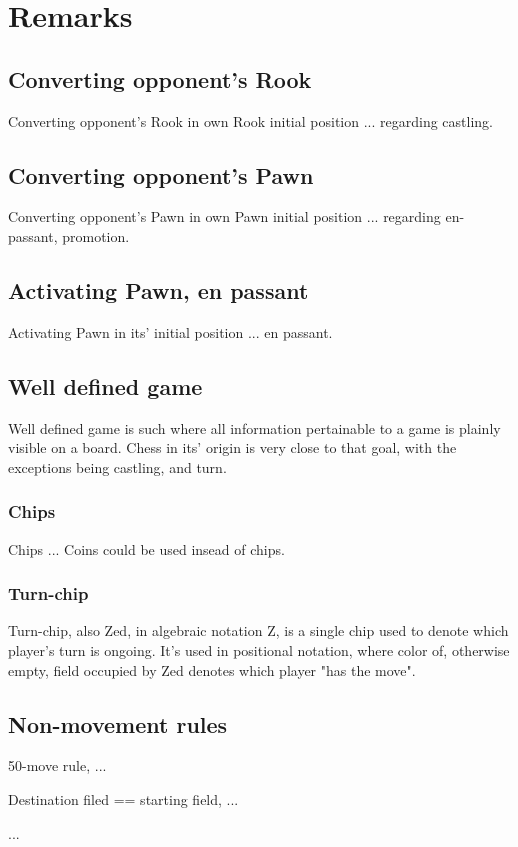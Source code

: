 
\chapter*{Remarks}

\section*{Converting opponent's Rook}

Converting opponent's Rook in own Rook initial position ... regarding castling.

\section*{Converting opponent's Pawn}

Converting opponent's Pawn in own Pawn initial position ... regarding en-passant, promotion.

\section*{Activating Pawn, en passant}

Activating Pawn in its' initial position ... en passant.

\section*{Well defined game}

Well defined game is such where all information pertainable to a game
is plainly visible on a board. Chess in its' origin is very close to
that goal, with the exceptions being castling, and turn.

\subsection*{Chips}
Chips ...
Coins could be used insead of chips.

\subsection*{Turn-chip}
Turn-chip, also Zed, in algebraic notation Z, is a single chip used to
denote which player's turn is ongoing. It's used in positional notation,
where color of, otherwise empty, field occupied by Zed denotes which
player "has the move".

\section*{Non-movement rules}

50-move rule, ...

Destination filed == starting field, ...

...

\clearpage %
